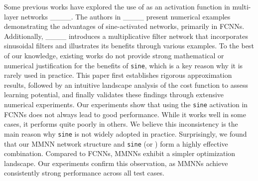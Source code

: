 

Some previous works have explored the use of \sine{} as an activation function in multi-layer networks ____. The authors in ____ present numerical examples demonstrating the advantages of sine-activated networks, primarily in FCNNs. Additionally, ____ introduces a multiplicative filter network that incorporates sinusoidal filters and illustrates its benefits through various examples.
To the best of our knowledge, existing works do not provide strong mathematical or numerical justification for the benefits of \texttt{sine}, which is a key reason why it is rarely used in practice.
This paper first establishes rigorous approximation results, followed by an intuitive landscape analysis of the cost function to assess learning potential, and finally validates these findings through extensive numerical experiments. Our experiments show that using the \texttt{sine} activation in FCNNs does not always lead to good performance. While it works well in some cases, it performs quite poorly in others. We believe this inconsistency is the main reason why \texttt{sine} is not widely adopted in practice.
Surprisingly, we found that our MMNN network structure and \texttt{sine} (or ) form a highly effective combination. Compared to FCNNs, MMNNs exhibit a simpler optimization landscape. Our experiments confirm this observation, as MMNNs achieve consistently strong performance across all test cases.




